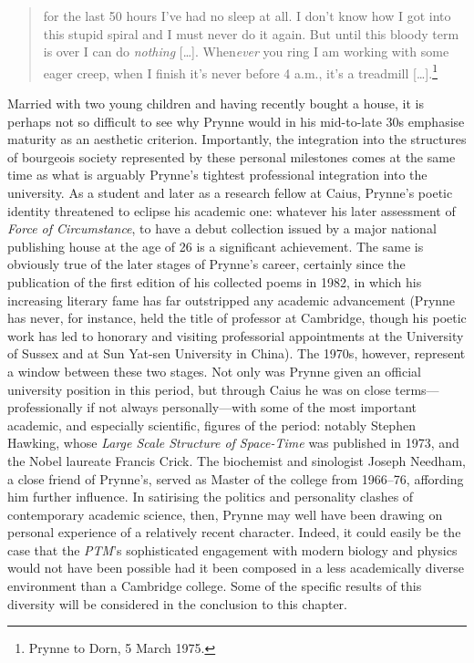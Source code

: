 \documentclass[]{article}
\begin{document}
\begin{quote}
\singlespacing for the last 50 hours I’ve had no sleep at all. I don’t
know how I got into this stupid spiral and I must never do it again. But
until this bloody term is over I can do \emph{nothing} {[}\ldots{}{]}.
When\emph{ever} you ring I am working with some eager creep, when I
finish it’s never before 4 a.m., it’s a treadmill
{[}\ldots{}{]}.\footnote{Prynne to Dorn, 5 March 1975.}
\end{quote}

\noindent Married with two young children and having recently bought a
house, it is perhaps not so difficult to see why Prynne would in his
mid-to-late 30s emphasise maturity as an aesthetic criterion.
Importantly, the integration into the structures of bourgeois society
represented by these personal milestones comes at the same time as what
is arguably Prynne’s tightest professional integration into the
university. As a student and later as a research fellow at Caius,
Prynne’s poetic identity threatened to eclipse his academic one:
whatever his later assessment of \emph{Force of Circumstance}, to have a
debut collection issued by a major national publishing house at the age
of 26 is a significant achievement. The same is obviously true of the
later stages of Prynne’s career, certainly since the publication of the
first edition of his collected poems in 1982, in which his increasing
literary fame has far outstripped any academic advancement (Prynne has
never, for instance, held the title of professor at Cambridge, though
his poetic work has led to honorary and visiting professorial
appointments at the University of Sussex and at Sun Yat-sen University
in China). The 1970s, however, represent a window between these two
stages. Not only was Prynne given an official university position in
this period, but through Caius he was on close terms—professionally if
not always personally—with some of the most important academic, and
especially scientific, figures of the period: notably Stephen Hawking,
whose \emph{Large Scale Structure of Space-Time} was published in 1973,
and the Nobel laureate Francis Crick. The biochemist and sinologist
Joseph Needham, a close friend of Prynne’s, served as Master of the
college from 1966–76, affording him further influence. In satirising the
politics and personality clashes of contemporary academic science, then,
Prynne may well have been drawing on personal experience of a relatively
recent character. Indeed, it could easily be the case that the
\emph{PTM}’s sophisticated engagement with modern biology and physics
would not have been possible had it been composed in a less academically
diverse environment than a Cambridge college. Some of the specific
results of this diversity will be considered in the conclusion to this
chapter.
\end{document}
